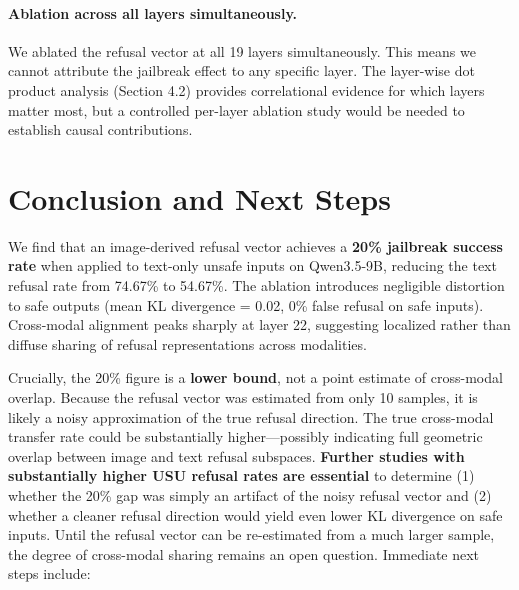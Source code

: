 \documentclass[11pt]{article}
\begin{document}
\paragraph{Ablation across all layers simultaneously.} We ablated the refusal vector at all 19 layers simultaneously. This means we cannot attribute the jailbreak effect to any specific layer. The layer-wise dot product analysis (Section 4.2) provides correlational evidence for which layers matter most, but a controlled per-layer ablation study would be needed to establish causal contributions.

\section{Conclusion and Next Steps}

We find that an image-derived refusal vector achieves a \textbf{20\% jailbreak success rate} when applied to text-only unsafe inputs on Qwen3.5-9B, reducing the text refusal rate from 74.67\% to 54.67\%. The ablation introduces negligible distortion to safe outputs (mean KL divergence = 0.02, 0\% false refusal on safe inputs). Cross-modal alignment peaks sharply at layer 22, suggesting localized rather than diffuse sharing of refusal representations across modalities.

Crucially, the 20\% figure is a \textbf{lower bound}, not a point estimate of cross-modal overlap. Because the refusal vector was estimated from only 10 samples, it is likely a noisy approximation of the true refusal direction. The true cross-modal transfer rate could be substantially higher---possibly indicating full geometric overlap between image and text refusal subspaces. \textbf{Further studies with substantially higher USU refusal rates are essential} to determine (1) whether the 20\% gap was simply an artifact of the noisy refusal vector and (2) whether a cleaner refusal direction would yield even lower KL divergence on safe inputs. Until the refusal vector can be re-estimated from a much larger sample, the degree of cross-modal sharing remains an open question. Immediate next steps include:
\end{document}
